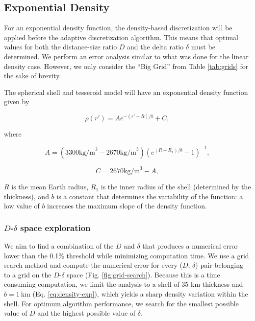 \documentclass[extra, referee]{gji}
\begin{document}
\subsection{Exponential Density}

For an exponential density function, the density-based discretization will be applied
before the adaptive discretization algorithm.
This means that optimal values for both the distance-size ratio $D$ and the delta ratio
$\delta$ must be determined.
We perform an error analysis similar to what was done for the linear density case.
However, we only consider the ``Big Grid'' from Table \ref{tab:grids} for the
sake of brevity.

The spherical shell and tesseroid model will have an exponential density function given
by

\begin{equation}
    \rho(r') = A e^{-(r' - R)/b} + C,
\label{eq:density-exp}
\end{equation}

\noindent where

\begin{equation}
    A =
    (3300 \text{kg/m}^3 - 2670 \text{kg/m}^3)
    \left( e^{( R - R_1 )/b} - 1 \right)^{-1},
\end{equation}

\begin{equation}
    C =
    2670 \text{kg/m}^3 - A,
\end{equation}

\noindent $R$ is the mean Earth radius, $R_1$ is the inner radius of the
shell (determined by the thickness), and $b$ is a constant that determines the
variability of the function: a low value of $b$ increases the maximum slope of the
density function.


\subsubsection{$D$-$\delta$ space exploration}

We aim to find a combination of the $D$ and $\delta$ that produces a numerical error
lower than the 0.1\% threshold while minimizing computation time.
We use a grid search method and compute the numerical error for every ($D$, $\delta$)
pair belonging to a grid on the $D$-$\delta$ space (Fig. \ref{fig:grid-search}).
Because this is a time consuming computation, we limit the analysis to a shell of 35 km
thickness and $b = 1\ \text{km}$ (Eq. \ref{eq:density-exp}), which yields a
sharp density variation within the shell.
For optimum algorithm performance, we search for the smallest possible value of $D$ and
the highest possible value of $\delta$.
\end{document}

